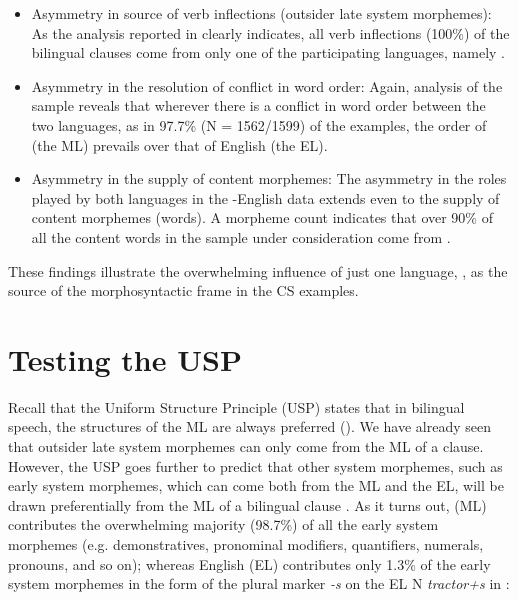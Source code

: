 \documentclass[output=paper]{langsci/langscibook}
\begin{document}
\begin{itemize}[noitemsep]
 \item Asymmetry in source of verb inflections (outsider late system morphemes): As the analysis reported in  clearly indicates, all verb inflections (100\%) of the bilingual clauses come from only one of the participating languages, namely .

 \item Asymmetry in the resolution of conflict in word order: Again, analysis of the sample reveals that wherever there is a conflict in word order between the two languages, as in 97.7\% (N = 1562/1599) of the examples, the order of  (the ML) prevails over that of English (the EL). 

 \item Asymmetry in the supply of content morphemes: The asymmetry in the roles played by both languages in the -English data extends even to the supply of content morphemes (words). A morpheme count indicates that over 90\% of all the content words in the sample under consideration come from .
 
\end{itemize}
 
 

These findings illustrate the overwhelming influence of just one language, , as the source of the morphosyntactic frame in the CS examples. 

\section{Testing the USP}\label{sec:ihemere:7}

Recall that the Uniform Structure Principle (USP) states that in bilingual speech, the structures of the ML are always preferred (). We have already seen that outsider late system morphemes can only come from the ML of a clause. However, the USP goes further to predict that other system morphemes, such as early system morphemes, which can come both from the ML and the EL, will be drawn preferentially from the ML of a bilingual clause \citep[8-9]{MyersScotton2002}. As it turns out,  (ML) contributes the overwhelming majority (98.7\%) of all the early system morphemes (e.g. demonstratives, pronominal modifiers, quantifiers, numerals, pronouns, and so on); whereas English (EL) contributes only 1.3\% of the early system morphemes in the form of the plural marker \textit{-s} on the EL N \textit{tractor+s} in : 
\end{document}
